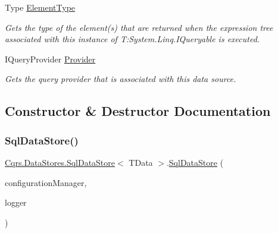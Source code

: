 \begin{DoxyCompactItemize}
Type \hyperlink{classCqrs_1_1DataStores_1_1SqlDataStore_ab96bad4f637c7cfc95e97598c8753d02_ab96bad4f637c7cfc95e97598c8753d02}{Element\+Type}
\begin{DoxyCompactList}\small\item\em Gets the type of the element(s) that are returned when the expression tree associated with this instance of T\+:\+System.\+Linq.\+I\+Queryable is executed. \end{DoxyCompactList}\item 
I\+Query\+Provider \hyperlink{classCqrs_1_1DataStores_1_1SqlDataStore_aec0093c6fe2adc41899c2418a0e324d9_aec0093c6fe2adc41899c2418a0e324d9}{Provider}
\begin{DoxyCompactList}\small\item\em Gets the query provider that is associated with this data source. \end{DoxyCompactList}\end{DoxyCompactItemize}


\subsection{Constructor \& Destructor Documentation}
\mbox{\label{classCqrs_1_1DataStores_1_1SqlDataStore_a0ce9b3f74799e463d4f53eda386d5577_a0ce9b3f74799e463d4f53eda386d5577}} 
\subsubsection{\texorpdfstring{Sql\+Data\+Store()}{SqlDataStore()}}
{\footnotesize\ttfamily \hyperlink{classCqrs_1_1DataStores_1_1SqlDataStore}{Cqrs.\+Data\+Stores.\+Sql\+Data\+Store}$<$ T\+Data $>$.\hyperlink{classCqrs_1_1DataStores_1_1SqlDataStore}{Sql\+Data\+Store} (\begin{DoxyParamCaption}\item[{\hyperlink{interfaceCqrs_1_1Configuration_1_1IConfigurationManager}{I\+Configuration\+Manager}}]{configuration\+Manager,  }\item[{I\+Logger}]{logger }\end{DoxyParamCaption})}



